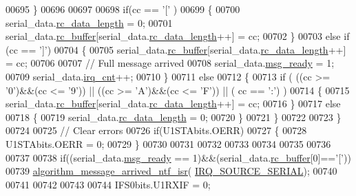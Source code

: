\begin{DoxyCode}
{{{{{{00695         \}
00696 
00697    
00698         \textcolor{keywordflow}{if}(cc == \textcolor{charliteral}{'['} )
00699         \{
00700             serial\_data.\hyperlink{a00028_ab136d4fef2c523afd55b6ca74c46d7cc}{rc\_data\_length} = 0;
00701             serial\_data.\hyperlink{a00028_ac734cb8be27f86bd99edc539434883a4}{rc\_buffer}[serial\_data.\hyperlink{a00028_ab136d4fef2c523afd55b6ca74c46d7cc}{rc\_data\_length}++] = cc;
00702         \}
00703         \textcolor{keywordflow}{else} \textcolor{keywordflow}{if} (cc == \textcolor{charliteral}{']'})
00704         \{
00705             serial\_data.\hyperlink{a00028_ac734cb8be27f86bd99edc539434883a4}{rc\_buffer}[serial\_data.\hyperlink{a00028_ab136d4fef2c523afd55b6ca74c46d7cc}{rc\_data\_length}++] = cc;
00706 
00707             \textcolor{comment}{// Full message arrived}
00708             serial\_data.\hyperlink{a00028_ac0789a6c9ab7ccd13d6f04ae31496854}{msg\_ready} = 1;
00709             serial\_data.\hyperlink{a00028_a15d632931355763426453b626cab774b}{irq\_cnt}++;
00710         \}
00711         \textcolor{keywordflow}{else}
00712         \{        
00713             \textcolor{keywordflow}{if} ( ((cc >= \textcolor{charliteral}{'0'})&&(cc <= \textcolor{charliteral}{'9'})) || ((cc >= \textcolor{charliteral}{'A'})&&(cc <= \textcolor{charliteral}{'F'})) || ( cc == \textcolor{charliteral}{':'}) )
00714             \{
00715                 serial\_data.\hyperlink{a00028_ac734cb8be27f86bd99edc539434883a4}{rc\_buffer}[serial\_data.\hyperlink{a00028_ab136d4fef2c523afd55b6ca74c46d7cc}{rc\_data\_length}++] = cc;
00716             \}
00717             \textcolor{keywordflow}{else}
00718             \{
00719                 serial\_data.\hyperlink{a00028_ab136d4fef2c523afd55b6ca74c46d7cc}{rc\_data\_length} = 0;
00720             \}                          
00721         \}
00722     
00723     \}
00724     
00725     \textcolor{comment}{// Clear errors}
00726     \textcolor{keywordflow}{if}(U1STAbits.OERR)
00727     \{
00728         U1STAbits.OERR = 0;
00729     \}
00730          
00731 
00732 
00733 
00734 
00735 
00736 
00737 
00738     \textcolor{keywordflow}{if}((serial\_data.\hyperlink{a00028_ac0789a6c9ab7ccd13d6f04ae31496854}{msg\_ready} == 1)&&(serial\_data.\hyperlink{a00028_ac734cb8be27f86bd99edc539434883a4}{rc\_buffer}[0]==\textcolor{charliteral}{'['}))
00739          \hyperlink{a00019_a85471d58eae93d5d7e7e2b52e2b915d3}{algorithm\_message\_arrived\_ntf\_isr}(
      \hyperlink{a00019_a286de80383de54438b3e38d9f149dfd0}{IRQ\_SOURCE\_SERIAL});
00740            
00741   
00742  
00743     
00744     IFS0bits.U1RXIF = 0;  
}}}}}}
\end{DoxyCode}
